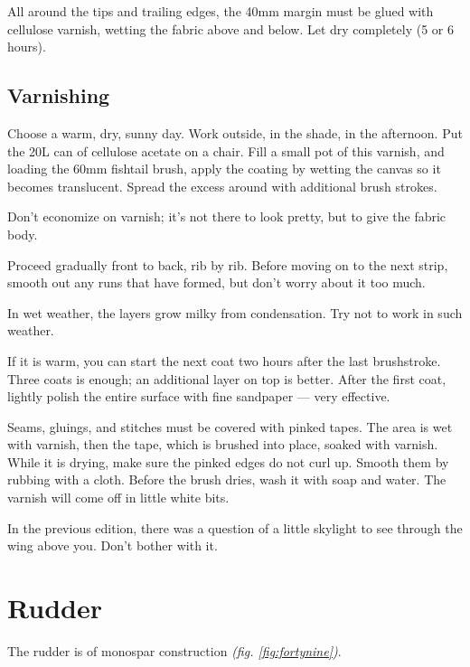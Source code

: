 \documentclass{book}
\begin{document}
All around the tips and trailing edges, the 40mm margin must be glued
with cellulose varnish, wetting the fabric above and below.  Let dry
completely (5 or 6 hours).

\subsection{Varnishing}

Choose a warm, dry, sunny day.  Work outside, in the shade, in the
afternoon.  Put the 20L can of cellulose acetate on a chair.  Fill a
small pot of this varnish, and loading the 60mm fishtail brush, apply
the coating by wetting the canvas so it becomes translucent.  Spread
the excess around with additional brush strokes.

Don't economize on varnish; it's not there to look pretty, but to give
the fabric body.

Proceed gradually front to back, rib by rib.  Before moving on to the
next strip, smooth out any runs that have formed, but don't worry
about it too much.

In wet weather, the layers grow milky from condensation.  Try not to
work in such weather.

If it is warm, you can start the next coat two hours after the last
brushstroke.  Three coats is enough; an additional layer on top is
better.  After the first coat, lightly polish the entire surface with
fine sandpaper --- very effective.

Seams, gluings, and stitches must be covered with pinked tapes.  The
area is wet with varnish, then the tape, which is brushed into place,
soaked with varnish.  While it is drying, make sure the pinked edges
do not curl up.  Smooth them by rubbing with a cloth.  Before the
brush dries, wash it with soap and water.  The varnish will come off
in little white bits.

In the previous edition, there was a question of a little skylight to
see through the wing above you.  Don't bother with it.

\section{Rudder}

The rudder is of monospar construction
\textit{(fig. \ref{fig:fortynine})}.
\end{document}
